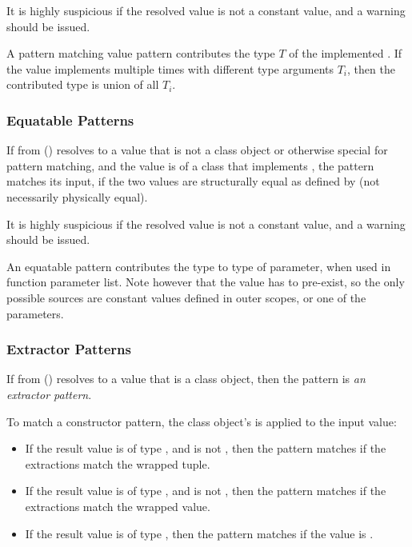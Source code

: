 It is highly suspicious if the resolved value is not a constant value, and a warning should be issued. 

A pattern matching value pattern contributes the type $T$ of the implemented . If the value implements  multiple times with different type arguments $T_i$, then the contributed type is union of all $T_i$. 





\subsubsection{Equatable Patterns}
\label{sec:equatable-patterns}

If  from () resolves to a value that is not a class object or otherwise special for pattern matching, and the value is of a class that implements , the pattern matches its input, if the two values are structurally equal as defined by  (not necessarily physically equal).

It is highly suspicious if the resolved value is not a constant value, and a warning should be issued. 

An equatable pattern contributes the type  to type of parameter, when used in function parameter list. Note however that the value has to pre-exist, so the only possible sources are constant values defined in outer scopes, or one of the parameters.





\subsubsection{Extractor Patterns}
\label{sec:extractor-patterns}

If  from () resolves to a value that is a class object, then the pattern is {\em an extractor pattern}. 

To match a constructor pattern, the class object's  is applied to the input value:
\begin{itemize}
  \item If the result value is of type , and is not , then the pattern matches if the extractions match the wrapped tuple. 
  \item If the result value is of type , and is not , then the pattern matches if the extractions match the wrapped value. 
  \item If the result value is of type , then the pattern matches if the value is . 
\end{itemize} 

